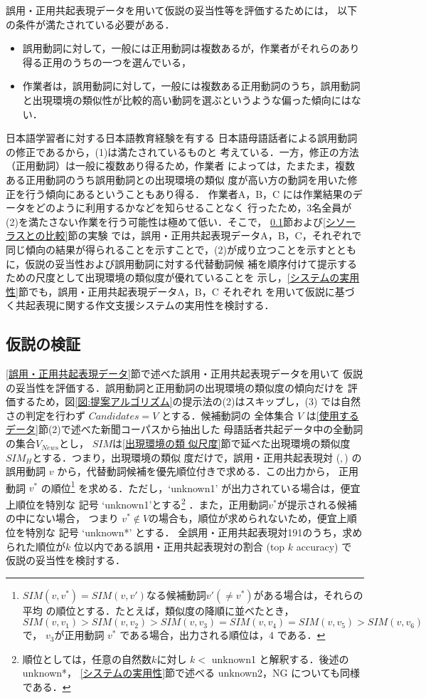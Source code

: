 \documentclass[japanese]{jnlp_1.4}
\newcommand{\tupple}[1]{}
\begin{document}
誤用・正用共起表現データを用いて仮説の妥当性等を評価するためには，
以下の条件が満たされている必要がある．
\begin{itemize}
\item[(1)] 
誤用動詞に対して，一般には正用動詞は複数あるが，作業者がそれらのあり得る正用のうちの一つを選んでいる，
\item[(2)] 
作業者は，誤用動詞に対して，一般には複数ある正用動詞のうち，誤用動詞と出現環境の類似性が比較的高い動詞を選ぶというような偏った傾向にはない．
\end{itemize}
日本語学習者に対する日本語教育経験を有する
日本語母語話者による誤用動詞の修正であるから，(1)は満たされているものと
考えている．一方，修正の方法（正用動詞）は一般に複数あり得るため，作業者
によっては，たまたま，複数ある正用動詞のうち誤用動詞との出現環境の類似
度が高い方の動詞を用いた修正を行う傾向にあるということもあり得る．
作業者A，B，C には作業結果のデータをどのように利用するかなどを知らせることなく
行ったため，3名全員が(2)を満たさない作業を行う可能性は極めて低い．そこで，
\ref{仮説の検証}節および\ref{シソーラスとの比較}節の実験
では，誤用・正用共起表現データA，B，C，それぞれで同じ傾向の結果が得られることを示すことで，(2)が成り立つことを示すとともに，仮説の妥当性および誤用動詞に対する代替動詞候
補を順序付けて提示するための尺度として出現環境の類似度が優れていることを
示し，\ref{システムの実用性}節でも，誤用・正用共起表現データA，B，C それぞれ
を用いて仮説に基づく共起表現に関する作文支援システムの実用性を検討する．


\subsection{仮説の検証}
\label{仮説の検証}

\ref{誤用・正用共起表現データ}節で述べた誤用・正用共起表現データを用いて
仮説の妥当性を評価する．誤用動詞と正用動詞の出現環境の類似度の傾向だけを
評価するため，図\ref{図:提案アルゴリズム}の提示法の(2)はスキップし，(3)
では自然さの判定を行わず $Candidates = V$ とする．候補動詞の
全体集合 $V$ は\ref{使用するデータ}節(2)で述べた新聞コーパスから抽出した
母語話者共起データ中の全動詞の集合$V_{News}$とし，
$SIM$は\ref{出現環境の類
似尺度}節で延べた出現環境の類似度$SIM_{H}$とする．つまり，出現環境の類似
度だけで，誤用・正用共起表現対 ($\tupple{n, c, v},\tupple{n, c, v^*}$) 
の誤用動詞 $v$ から，代替動詞候補を優先順位付きで求める．この出力から，
正用動詞 $v^*$ の順位\footnote{
$SIM(v,v^*)=SIM(v,v')$なる候補動詞$v'(\neq v^*)$がある場合は，それらの平均
の順位とする．たとえば，類似度の降順に並べたとき，$SIM(v,v_{1})> SIM(v,
v_{2})>SIM(v, v_{3}) = SIM(v, v_{4}) = SIM(v, v_{5})> SIM(v, v_{6})$ で，
$v_{3}$が正用動詞 $v^*$ である場合，出力される順位は，4 である．
}
を求める．ただし，`unknown1' が出力されている場合は，便宜上順位を特別な
記号 `unknown1'とする\footnote{
順位としては，任意の自然数$k$に対し $k<$ unknown1 と解釈する．後述の unknown*，
\ref{システムの実用性}節で述べる unknown2，NG についても同様である．
}
．また，正用動詞$v^*$が提示される候補の中にない場合，
つまり $v^*\notin V$の場合も，順位が求められないため，便宜上順位を特別な
記号 `unknown*' とする．
全誤用・正用共起表現対191のうち，求め
られた順位が$k$ 位以内である誤用・正用共起表現対の割合 (top $k$ accuracy) で
仮説の妥当性を検討する．
\end{document}
